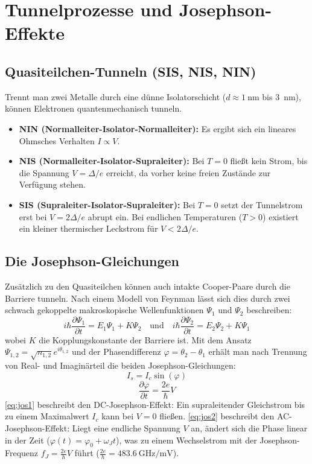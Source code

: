 \section{Tunnelprozesse und Josephson-Effekte}

\subsection{Quasiteilchen-Tunneln (SIS, NIS, NIN)}
Trennt man zwei Metalle durch eine dünne Isolatorschicht ($d \approx \SI{1}{\nano\meter}$ bis \SI{3}{\nano\meter}), können Elektronen quantenmechanisch tunneln. 
\begin{itemize}
    \item \textbf{NIN (Normalleiter-Isolator-Normalleiter):} Es ergibt sich ein lineares Ohmsches Verhalten $I \propto V$.
    \item \textbf{NIS (Normalleiter-Isolator-Supraleiter):} Bei $T=0$ fließt kein Strom, bis die Spannung $V = \Delta/e$ erreicht, da vorher keine freien Zustände zur Verfügung stehen.
    \item \textbf{SIS (Supraleiter-Isolator-Supraleiter):} Bei $T=0$ setzt der Tunnelstrom erst bei $V = 2\Delta/e$ abrupt ein. Bei endlichen Temperaturen ($T > 0$) existiert ein kleiner thermischer Leckstrom für $V < 2\Delta/e$.
\end{itemize}

\subsection{Die Josephson-Gleichungen}
Zusätzlich zu den Quasiteilchen können auch intakte Cooper-Paare durch die Barriere tunneln. Nach einem Modell von Feynman lässt sich dies durch zwei schwach gekoppelte makroskopische Wellenfunktionen $\Psi_1$ und $\Psi_2$ beschreiben:
\begin{equation}
    i\hbar \frac{\partial \Psi_1}{\partial t} = E_1 \Psi_1 + K \Psi_2 \quad \text{und} \quad i\hbar \frac{\partial \Psi_2}{\partial t} = E_2 \Psi_2 + K \Psi_1
\end{equation}
wobei $K$ die Kopplungskonstante der Barriere ist. Mit dem Ansatz $\Psi_{1,2} = \sqrt{n_{1,2}} e^{i\theta_{1,2}}$ und der Phasendifferenz $\varphi = \theta_2 - \theta_1$ erhält man nach Trennung von Real- und Imaginärteil die beiden Josephson-Gleichungen:
\begin{equation}
    I_s = I_c \sin(\varphi)
    \label{eq:jos1}
\end{equation}
\begin{equation}
    \frac{\partial \varphi}{\partial t} = \frac{2e}{\hbar} V
    \label{eq:jos2}
\end{equation}
\cref{eq:jos1} beschreibt den DC-Josephson-Effekt: Ein supraleitender Gleichstrom bis zu einem Maximalwert $I_c$ kann bei $V=0$ fließen. \cref{eq:jos2} beschreibt den AC-Josephson-Effekt: Liegt eine endliche Spannung $V$ an, ändert sich die Phase linear in der Zeit ($\varphi(t) = \varphi_0 + \omega_J t$), was zu einem Wechselstrom mit der Josephson-Frequenz $f_J = \frac{2e}{h}V$ führt ($\frac{2e}{h}=\SI{483.6}{\giga\hertz\per\milli\volt}$).

